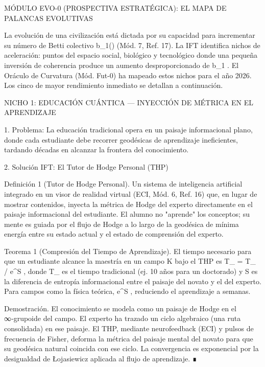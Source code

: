 \documentclass[12pt,a4paper]{book}
\begin{document}
MÓDULO EVO-0 (PROSPECTIVA ESTRATÉGICA): EL MAPA DE PALANCAS EVOLUTIVAS

La evolución de una civilización está dictada por su capacidad para incrementar su número de Betti colectivo  b_1(\Xi)  (Mód. 7, Ref. 17). La IFT identifica nichos de aceleración: puntos del espacio social, biológico y tecnológico donde una pequeña inversión de coherencia produce un aumento desproporcionado de  \Delta b_1 . El Oráculo de Curvatura (Mód. Fut-0) ha mapeado estos nichos para el año 2026. Los cinco de mayor rendimiento inmediato se detallan a continuación.

NICHO 1: EDUCACIÓN CUÁNTICA — INYECCIÓN DE MÉTRICA EN EL APRENDIZAJE

1. Problema: La educación tradicional opera en un paisaje informacional plano, donde cada estudiante debe recorrer geodésicas de aprendizaje ineficientes, tardando décadas en alcanzar la frontera del conocimiento.

2. Solución IFT: El Tutor de Hodge Personal (THP)

Definición 1 (Tutor de Hodge Personal). Un sistema de inteligencia artificial integrado en un visor de realidad virtual (ECI, Mód. 6, Ref. 16) que, en lugar de mostrar contenidos, inyecta la métrica de Hodge del experto directamente en el paisaje informacional del estudiante. El alumno no "aprende" los conceptos; su mente es guiada por el flujo de Hodge a lo largo de la geodésica de mínima energía entre su estado actual y el estado de comprensión del experto.

Teorema 1 (Compresión del Tiempo de Aprendizaje). El tiempo necesario para que un estudiante alcance la maestría en un campo  K  bajo el THP es  T_{} = T_{} / e^{\Delta S} , donde  T_{}  es el tiempo tradicional (ej. 10 años para un doctorado) y  \Delta S  es la diferencia de entropía informacional entre el paisaje del novato y el del experto. Para campos como la física teórica,  e^{\Delta S}  , reduciendo el aprendizaje a semanas.

Demostración. El conocimiento se modela como un paisaje de Hodge en el ∞‑grupoide del campo. El experto ha trazado un ciclo algebraico (una ruta consolidada) en ese paisaje. El THP, mediante neurofeedback (ECI) y pulsos de frecuencia de Fisher, deforma la métrica del paisaje mental del novato para que su geodésica natural coincida con ese ciclo. La convergencia es exponencial por la desigualdad de Łojasiewicz aplicada al flujo de aprendizaje. ∎
\end{document}
